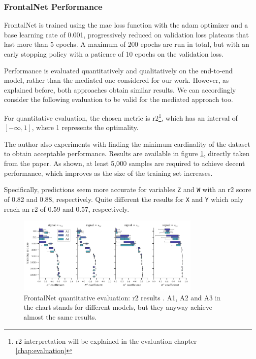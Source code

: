 \subsubsection{FrontalNet Performance}
\label{subsec:frontalnet-performance}

FrontalNet is trained using the \gls{mae} loss function with the \gls{adam} optimizer \cite{kingma2014adam} and a base learning rate of 0.001, progressively reduced on validation loss plateaus that last more than 5 epochs. A maximum of 200 epochs are run in total, but with an early stopping policy with a patience of 10 epochs on the validation loss. 

Performance is evaluated quantitatively and qualitatively on the end-to-end model, rather than the mediated one considered for our work. However, as explained before, both approaches obtain similar results. We can accordingly consider the following evaluation to be valid for the mediated approach too.

\medskip 

For quantitative evaluation, the chosen metric is \gls{r2}\footnote{\gls{r2} interpretation will be explained in the evaluation chapter \ref{chap:evaluation}}, which has an interval of $[-\infty, 1]$, where 1 represents the optimality. 

The author also experiments with finding the minimum cardinality of the dataset to obtain acceptable performance. Results are available in figure \ref{fig:frontalnet-r2}, directly taken from the paper. As shown, at least 5,000 samples are required to achieve decent performance, which improves as the size of the training set increases.

Specifically, predictions seem more accurate for variables \texttt{Z} and \texttt{W} with an \gls{r2} score of 0.82 and 0.88, respectively. Quite different the results for \texttt{X} and \texttt{Y} which only reach an \gls{r2} of 0.59 and 0.57, respectively.

\begin{figure}[!htb]
	\centering
	\includegraphics[width=0.8\textwidth]{"contents/images/03-frontalnet-r2"}
	\caption[FrontalNet quantitative evaluation: \gls{r2} results \cite{mantegazza2019visionbased}]{FrontalNet quantitative evaluation: \gls{r2} results \cite{mantegazza2019visionbased}. A1, A2 and A3 in the chart stands for different models, but they anyway achieve almost the same results.}
	\label{fig:frontalnet-r2}
\end{figure}

